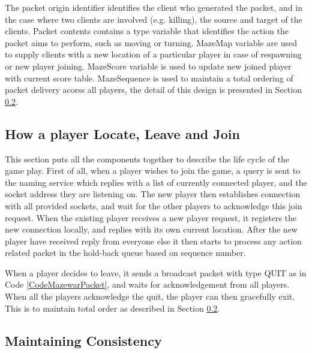 The packet origin identifier identifies the client who generated the packet, and in the case where two clients are involved (e.g. killing), the source and target of the clients. Packet contents contains a type variable that identifies the action the packet aims to perform, such as moving or turning. MazeMap variable are used to supply clients with a new location of a particular player in case of respawning or new player joining. MazeScore variable is used to update new joined player with current score table. MazeSequence is used to maintain a total ordering of packet delivery acorss all players, the detail of this design is presented in Section \ref{DesignConsistency}.

\subsection{How a player Locate, Leave and Join}\label{DesignGameFlow}

This section puts all the components together to describe the life cycle of the game play. First of all, when a player wishes to join the game, a query is sent to the naming service which replies with a list of currently connected player, and the socket address they are listening on. The new player then establishes connection with all provided sockets, and wait for the other players to acknowledge this join request. When the existing player receives a new player request, it registers the new connection locally, and replies with its own current location. After the new player have received reply from everyone else it then starts to process any action related packet in the hold-back queue based on sequence number.

When a player decides to leave, it sends a broadcast packet with type QUIT as in Code \ref{CodeMazewarPacket}, and waits for acknowledgement from all players. When all the players acknowledge the quit, the player can then gracefully exit. This is to maintain total order as described in Section \ref{DesignConsistency}.

\subsection{Maintaining Consistency}\label{DesignConsistency}


